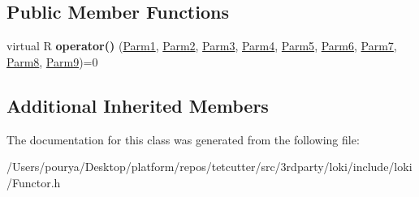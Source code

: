 \subsection*{Public Member Functions}
\begin{DoxyCompactItemize}
\item 
\hypertarget{classLoki_1_1FunctorImpl_3_01R_00_01LOKI__TYPELIST__9_07P1_00_01P2_00_01P3_00_01P4_00_01P5_00_01493beb80705da8521e05ba7a51e552dd_a73ae43e48f35c397a7d24a06fe10257e}{}virtual R {\bfseries operator()} (\hyperlink{classLoki_1_1EmptyType}{Parm1}, \hyperlink{classLoki_1_1EmptyType}{Parm2}, \hyperlink{classLoki_1_1EmptyType}{Parm3}, \hyperlink{classLoki_1_1EmptyType}{Parm4}, \hyperlink{classLoki_1_1EmptyType}{Parm5}, \hyperlink{classLoki_1_1EmptyType}{Parm6}, \hyperlink{classLoki_1_1EmptyType}{Parm7}, \hyperlink{classLoki_1_1EmptyType}{Parm8}, \hyperlink{classLoki_1_1EmptyType}{Parm9})=0\label{classLoki_1_1FunctorImpl_3_01R_00_01LOKI__TYPELIST__9_07P1_00_01P2_00_01P3_00_01P4_00_01P5_00_01493beb80705da8521e05ba7a51e552dd_a73ae43e48f35c397a7d24a06fe10257e}

\end{DoxyCompactItemize}
\subsection*{Additional Inherited Members}


The documentation for this class was generated from the following file\+:\begin{DoxyCompactItemize}
\item 
/\+Users/pourya/\+Desktop/platform/repos/tetcutter/src/3rdparty/loki/include/loki/Functor.\+h\end{DoxyCompactItemize}
